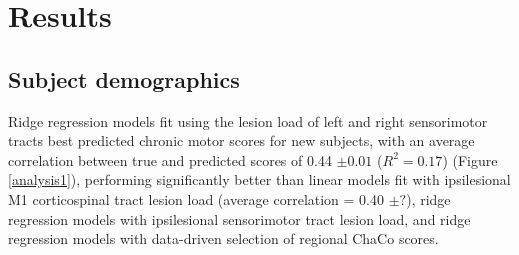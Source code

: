 \documentclass[10pt]{article}
\begin{document}
\section{Results}
\subsection*{Subject demographics}


Ridge regression models fit using the lesion load of left and right sensorimotor tracts best predicted chronic motor scores for new subjects, with an average correlation between true and predicted scores of 0.44 $\pm 0.01$ ($R^2 = 0.17$) (Figure \ref{analysis1}), performing significantly better than linear models fit with ipsilesional M1 corticospinal tract lesion load (average correlation = 0.40 $\pm ?$), ridge regression models with ipsilesional sensorimotor tract lesion load, and ridge regression models with data-driven selection of regional ChaCo scores.
\end{document}

